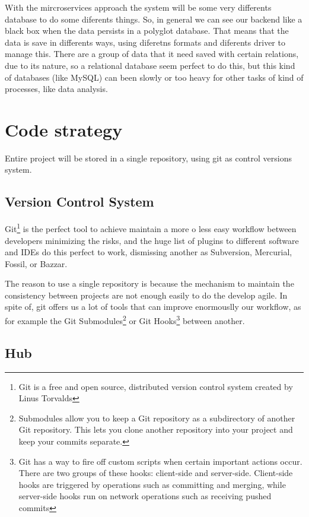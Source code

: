 With the mircroservices approach the system will be some very differents
database to do some diferents things. So, in general we can see our
backend like a black box when the data persists in a polyglot database.
That means that the data is save in differents ways, using diferetns
formats and diferents driver to manage this. There are a group of
data that it need saved with certain relations, due to its nature,
so a relational database seem perfect to do this, but this kind of
databases (like MySQL) can been slowly or too heavy for other tasks
of kind of processes, like data analysis.

\section{Code strategy}


Entire project will be stored in a single repository, using git as control
versions system.

\subsection{Version Control System}

Git\footnote{Git is a free and open source, distributed version control system
created by Linus Torvalds} is the perfect tool to achieve maintain a more o
less easy workflow between developers minimizing the risks, and the huge list of
plugins to different software and IDEs do this perfect to work, dismissing another
as Subversion, Mercurial, Fossil, or Bazzar.

The reason to use a single repository is because the mechanism to maintain the
consistency between projects are not enough easily to do the develop agile.
In spite of, git offers us a lot of tools that can improve enormouslly our
workflow, as for example the Git Submodules\footnote{Submodules allow you to keep a
Git repository as a subdirectory of another Git repository.
This lets you clone another repository into your project and keep your commits
separate.} or Git Hooks\footnote{Git has a way to fire off custom scripts when
certain important actions occur. There are two groups of these hooks:
client-side and server-side. Client-side hooks are triggered by operations such
as committing and merging, while server-side hooks run on network operations
such as receiving pushed commits} between another.

\subsection{Hub}

